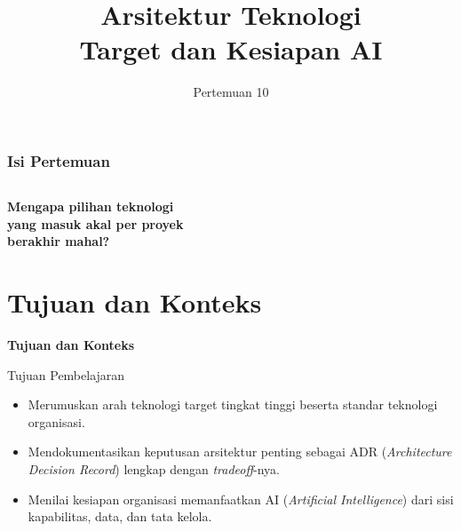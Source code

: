 \documentclass[aspectratio=169, table, 12pt]{beamer}
\title{\Huge Arsitektur Teknologi\\ \vspace{10pt} Target dan Kesiapan AI}
\date{Pertemuan 10}
\begin{document}
\frame{\titlepage}

\begin{frame}
  \frametitle{Isi Pertemuan}
  \vspace{14pt}
  \begin{columns}[t]
    {\small\tableofcontents[sections={1-3}]}

    {\small\tableofcontents[sections={4-5}]}
  \end{columns}
\end{frame}

\begin{frame}{\hfill}
  \centering
  \Huge{\textbf{Mengapa pilihan teknologi\\yang masuk akal per proyek\\berakhir mahal?}}
\end{frame}

\section{Tujuan dan Konteks}

\begin{frame}{\hfill}
  \centering
  \Huge{\textbf{Tujuan dan Konteks}}
\end{frame}

\begin{frame}{{\Large Tujuan Pembelajaran}}
  \vspace{10pt}
  \begin{itemize}
    \item Merumuskan arah teknologi target tingkat tinggi beserta standar teknologi organisasi.
    \item Mendokumentasikan keputusan arsitektur penting sebagai ADR (\textit{Architecture Decision
          Record}) lengkap dengan \textit{tradeoff}-nya.
    \item Menilai kesiapan organisasi memanfaatkan AI (\textit{Artificial Intelligence}) dari sisi
          kapabilitas, data, dan tata kelola.
  \end{itemize}
\end{frame}
\end{document}
